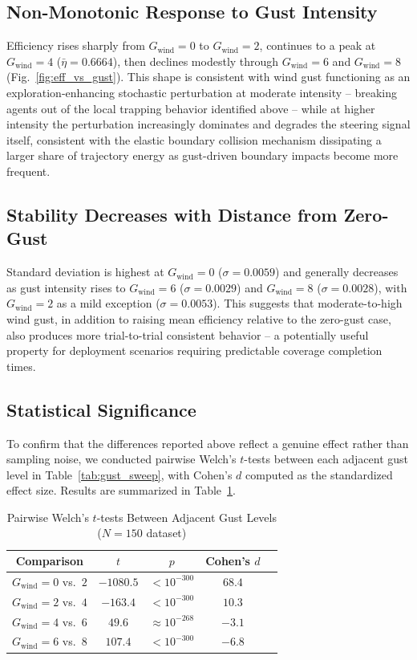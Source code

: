 \documentclass[10pt,journal]{IEEEtran}
\begin{document}
\subsection{Non-Monotonic Response to Gust Intensity}
Efficiency rises sharply from $G_{\text{wind}}=0$ to $G_{\text{wind}}=2$,
continues to a peak at $G_{\text{wind}}=4$ ($\bar{\eta}=0.6664$), then
declines modestly through $G_{\text{wind}}=6$ and $G_{\text{wind}}=8$
(Fig.~\ref{fig:eff_vs_gust}). This shape is consistent with wind gust
functioning as an exploration-enhancing stochastic perturbation at moderate
intensity -- breaking agents out of the local trapping behavior identified
above -- while at higher intensity the perturbation increasingly dominates
and degrades the steering signal itself, consistent with the elastic
boundary collision mechanism dissipating a larger share of trajectory
energy as gust-driven boundary impacts become more frequent.

\subsection{Stability Decreases with Distance from Zero-Gust}
Standard deviation is highest at $G_{\text{wind}}=0$ ($\sigma=0.0059$) and
generally decreases as gust intensity rises to $G_{\text{wind}}=6$
($\sigma=0.0029$) and $G_{\text{wind}}=8$ ($\sigma=0.0028$), with
$G_{\text{wind}}=2$ as a mild exception ($\sigma=0.0053$). This suggests
that moderate-to-high wind gust, in addition to raising mean efficiency
relative to the zero-gust case, also produces more trial-to-trial
consistent behavior -- a potentially useful property for deployment
scenarios requiring predictable coverage completion times.

\subsection{Statistical Significance}
\label{sec:stats}
To confirm that the differences reported above reflect a genuine effect
rather than sampling noise, we conducted pairwise Welch's $t$-tests between
each adjacent gust level in Table~\ref{tab:gust_sweep}, with Cohen's $d$
computed as the standardized effect size. Results are summarized in
Table~\ref{tab:ttests}.

\begin{table}[t]
\centering
\caption{Pairwise Welch's $t$-tests Between Adjacent Gust Levels ($N=150$ dataset)}
\label{tab:ttests}
\begin{tabular}{@{}ccccc@{}}
\toprule
Comparison & $t$ & $p$ & Cohen's $d$ \\
\midrule
$G_{\text{wind}}{=}0$ vs.\ $2$ & $-1080.5$ & $<10^{-300}$ & $68.4$ \\
$G_{\text{wind}}{=}2$ vs.\ $4$ & $-163.4$ & $<10^{-300}$ & $10.3$ \\
$G_{\text{wind}}{=}4$ vs.\ $6$ & $49.6$ & $\approx10^{-268}$ & $-3.1$ \\
$G_{\text{wind}}{=}6$ vs.\ $8$ & $107.4$ & $<10^{-300}$ & $-6.8$ \\
\bottomrule
\end{tabular}
\end{table}
\end{document}

